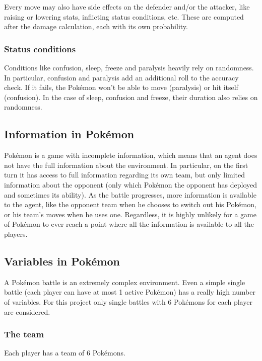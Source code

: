 \documentclass{article}
\begin{document}
Every move may also have side effects on the defender and/or the attacker, like raising or lowering stats, inflicting status conditions, etc.
These are computed after the damage calculation, each with its own probability.

\subsubsection{Status conditions}
Conditions like confusion, sleep, freeze and paralysis heavily rely on randomness.
In particular, confusion and paralysis add an additional roll to the accuracy check. If it fails, the Pokémon won't be able to move (paralysis) or hit itself (confusion).
In the case of sleep, confusion and freeze, their duration also relies on randomness.

\subsection{Information in Pokémon}

Pokémon is a game with incomplete information, which means that an agent does not have the full information about the environment.
In particular, on the first turn it has access to full information regarding its own team, but only limited information about the opponent (only which Pokémon the opponent has deployed and sometimes its ability).
As the battle progresses, more information is available to the agent, like the opponent team when he chooses to switch out his Pokémon, or his team's moves when he uses one.
Regardless, it is highly unlikely for a game of Pokémon to ever reach a point where all the information is available to all the players.

\subsection{Variables in Pokémon}

A Pokémon battle is an extremely complex environment.
Even a simple single battle (each player can have at most 1 active Pokémon) has a really high number of variables.
For this project only single battles with 6 Pokémons for each player are considered.

\subsubsection{The team}

Each player has a team of 6 Pokémons.
\end{document}
